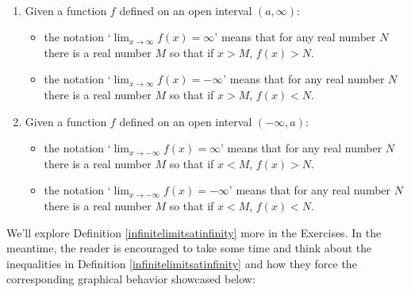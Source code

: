 \documentclass{ximera}
\begin{document}
\begin{definition}  \label{infinitelimitsatinfinity}  $~$

\begin{enumerate}

\item  Given a function $f$ defined on an open interval  $(a, \infty)$:

\begin{itemize}

\item   the notation `$\lim_{x \rightarrow \infty} f(x) = \infty$' means that for any real number $N$ there is a real number $M$ so that if $x > M$, $f(x) > N$.

\item   the notation `$\lim_{x \rightarrow \infty} f(x) = -\infty$' means that for any real number $N$ there is a real number $M$ so that if $x > M$, $f(x) < N$.

\end{itemize}

\item  Given a function $f$ defined on an open interval  $(-\infty, a)$:

\begin{itemize}

\item   the notation `$\lim_{x \rightarrow -\infty} f(x) = \infty$' means that for any real number $N$ there is a real number $M$ so that if $x < M$, $f(x) > N$.

\item   the notation `$\lim_{x \rightarrow -\infty} f(x) = -\infty$' means that for any real number $N$ there is a real number $M$ so that if $x < M$, $f(x) < N$.

\end{itemize}

\end{enumerate}

\end{definition}



We'll explore Definition \ref{infinitelimitsatinfinity} more in the Exercises. In the meantime, the reader is encouraged to take some time and think about the inequalities in Definition \ref{infinitelimitsatinfinity} and how they force the corresponding graphical behavior showcased below:
\end{document}
